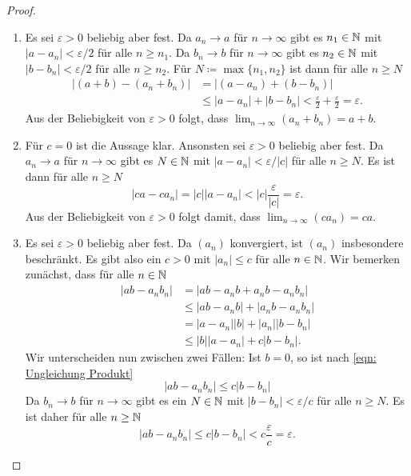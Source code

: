 \documentclass[a4paper,10pt]{article}
\begin{document}
\begin{proof}
 \begin{enumerate}
  \item
   Es sei $\varepsilon > 0$ beliebig aber fest. Da $a_n \to a$ für $n \to \infty$ gibt es $n_1 \in \mathbb{N}$ mit $|a - a_n| < \varepsilon/2$ für alle $n \geq n_1$. Da $b_n \to b$ für $n \to \infty$ gibt es $n_2 \in \mathbb{N}$ mit $|b - b_n| < \varepsilon/2$ für alle $n \geq n_2$. Für $N \coloneqq \max \{n_1, n_2\}$ ist dann für alle $n \geq N$
   \begin{align*}
    |(a + b) - (a_n + b_n)|
    &= |(a - a_n) + (b - b_n)| \\
    &\leq |a - a_n| + |b - b_n|
    < \frac{\varepsilon}{2} + \frac{\varepsilon}{2}
    = \varepsilon.
   \end{align*}
   Aus der Beliebigkeit von $\varepsilon > 0$ folgt, dass $\lim_{n \to \infty} (a_n + b_n) = a + b$.
  \item
   Für $c = 0$ ist die Aussage klar. Ansonsten sei $\varepsilon > 0$ beliebig aber fest. Da $a_n \to a$ für $n \to \infty$ gibt es $N \in \mathbb{N}$ mit $|a - a_n| < \varepsilon/|c|$ für alle $n \geq N$. Es ist dann für alle $n \geq N$
   \[
    |ca - ca_n|
    = |c| |a - a_n|
    < |c| \frac{\varepsilon}{|c|}
    = \varepsilon.
   \]
   Aus der Beliebigkeit von $\varepsilon > 0$ folgt damit, dass $\lim_{n \to \infty} (ca_n) = ca$.
  \item
   Es sei $\varepsilon > 0$ beliebig aber fest. Da $(a_n)$ konvergiert, ist $(a_n)$ insbesondere beschränkt. Es gibt also ein $c > 0$ mit $|a_n| \leq c$ für alle $n \in \mathbb{N}$. Wir bemerken zunächst, dass für alle $n \in \mathbb{N}$
   \begin{equation}\label{eqn: Ungleichung Produkt}
    \begin{aligned}
     |a b - a_n b_n|
     &= |a b - a_n b + a_n b - a_n b_n| \\
     &\leq |a b - a_n b| + |a_n b - a_n b_n| \\
     &= |a - a_n| |b| + |a_n| |b - b_n| \\
     &\leq |b| |a - a_n| + c |b - b_n|.
    \end{aligned}
   \end{equation}
   Wir unterscheiden nun zwischen zwei Fällen: Ist $b = 0$, so ist nach \eqref{eqn: Ungleichung Produkt}
   \[
    |a b - a_n b_n| \leq c |b - b_n|
   \]
   Da $b_n \to b$ für $n \to \infty$ gibt es ein $N \in \mathbb{N}$ mit $|b - b_n| < \varepsilon/c$ für alle $n \geq N$. Es ist daher für alle $n \geq \mathbb{N}$
   \[
    |a b - a_n b_n| \leq c |b - b_n| < c \frac{\varepsilon}{c} = \varepsilon.
\]
\end{enumerate}
\end{proof}
\end{document}
